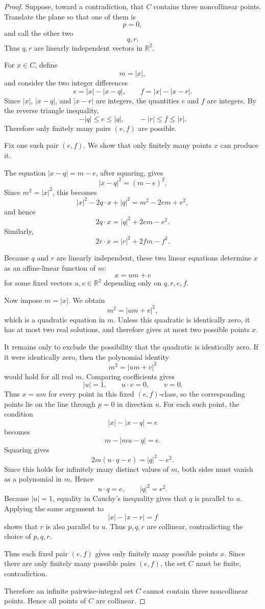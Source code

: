 \documentclass[11pt]{article}
\newcommand{\R}{\mathbb R}
\begin{document}
\begin{proof}
Suppose, toward a contradiction, that \(C\) contains three noncollinear points. Translate the plane so that one of them is
\[
p=0,
\]
and call the other two
\[
q,r.
\]
Thus \(q,r\) are linearly independent vectors in \(\R^2\).

For \(x\in C\), define
\[
m=|x|,
\]
and consider the two integer differences
\[
e=|x|-|x-q|,
\qquad
f=|x|-|x-r|.
\]
Since \(|x|\), \(|x-q|\), and \(|x-r|\) are integers, the quantities \(e\) and \(f\) are integers. By the reverse triangle inequality,
\[
-|q|\leq e\leq |q|,
\qquad
-|r|\leq f\leq |r|.
\]
Therefore only finitely many pairs \((e,f)\) are possible.

Fix one such pair \((e,f)\). We show that only finitely many points \(x\) can produce it.

The equation \(|x-q|=m-e\), after squaring, gives
\[
|x-q|^2=(m-e)^2.
\]
Since \(m^2=|x|^2\), this becomes
\[
|x|^2-2q\cdot x+|q|^2
=
m^2-2em+e^2,
\]
and hence
\[
2q\cdot x
=
|q|^2+2em-e^2.
\]
Similarly,
\[
2r\cdot x
=
|r|^2+2fm-f^2.
\]

Because \(q\) and \(r\) are linearly independent, these two linear equations determine \(x\) as an affine-linear function of \(m\):
\[
x=u m+v
\]
for some fixed vectors \(u,v\in \R^2\) depending only on \(q,r,e,f\).

Now impose \(m=|x|\). We obtain
\[
m^2=|u m+v|^2,
\]
which is a quadratic equation in \(m\). Unless this quadratic is identically zero, it has at most two real solutions, and therefore gives at most two possible points \(x\).

It remains only to exclude the possibility that the quadratic is identically zero. If it were identically zero, then the polynomial identity
\[
m^2=|u m+v|^2
\]
would hold for all real \(m\). Comparing coefficients gives
\[
|u|=1,\qquad u\cdot v=0,\qquad v=0.
\]
Thus \(x=um\) for every point in this fixed \((e,f)\)-class, so the corresponding points lie on the line through \(p=0\) in direction \(u\). For each such point, the condition
\[
|x|-|x-q|=e
\]
becomes
\[
m-|mu-q|=e.
\]
Squaring gives
\[
2m(u\cdot q-e)=|q|^2-e^2.
\]
Since this holds for infinitely many distinct values of \(m\), both sides must vanish as a polynomial in \(m\). Hence
\[
u\cdot q=e,
\qquad
|q|^2=e^2.
\]
Because \(|u|=1\), equality in Cauchy's inequality gives that \(q\) is parallel to \(u\). Applying the same argument to
\[
|x|-|x-r|=f
\]
shows that \(r\) is also parallel to \(u\). Thus \(p,q,r\) are collinear, contradicting the choice of \(p,q,r\).

Thus each fixed pair \((e,f)\) gives only finitely many possible points \(x\). Since there are only finitely many possible pairs \((e,f)\), the set \(C\) must be finite, contradiction.

Therefore an infinite pairwise-integral set \(C\) cannot contain three noncollinear points. Hence all points of \(C\) are collinear.
\end{proof}
\end{document}
